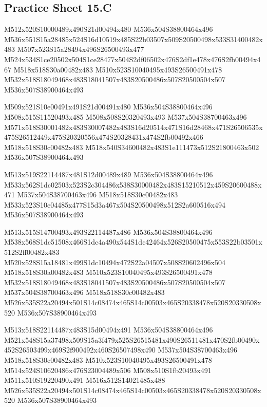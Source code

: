 \documentclass{article}
\begin{document}
\subsection{Practice Sheet 15.C}

\begin{multicols}{5}
\begin{center}

M512x520S10000489x490S21d00494x480 %
M536x504S38800464x496 %
M536x551S15a28485x524S16d10519x485S22b03507x509S20500498x533S31400482x483 %
M507x523S15a28494x496S26500493x477 %
M524x534S1ce20502x504S1ce28477x504S2df06502x476S2df1e478x476S2fb00494x467 %
M518x518S30a00482x483 %
M510x523S10040495x493S26500491x478 %
M532x518S18049468x483S18041507x483S20500486x507S20500504x507 %
M536x507S38900464x493 %
\vfil
\columnbreak

M509x521S10e00491x491S21d00491x480 %
M536x504S38800464x496 %
M508x515S11520493x485 %
M508x508S20320493x493 %
M537x504S38700463x496 %
M571x518S30001482x483S30007482x483S16d20514x471S16d28468x471S26506535x475S26512449x475S20320556x474S20328431x474S2fb00492x466 %
M518x518S30c00482x483 %
M518x540S34600482x483S1e111473x512S21800463x502 %
M536x507S38900464x493 %
\vfil
\columnbreak

M513x519S22114487x481S12d00489x489 %
M536x504S38800464x496 %
M533x562S1dc02503x523S2c304486x538S30000482x483S15210512x459S20600488x471 %
M537x504S38700463x496 %
M518x518S30c00482x483 %
M533x523S10e04485x477S15d3a467x504S20500498x512S2a600516x494 %
M536x507S38900464x493 %
\vfil
\columnbreak

M513x515S14700493x493S22114487x486 %
M536x504S38800464x496 %
M538x568S1dc51508x466S1dc4a490x544S1dc42464x526S20500475x553S22b03501x512S2ff00482x483 %
M520x528S15a18481x499S1dc10494x472S22a04507x508S20602496x504 %
M518x518S30a00482x483 %
M510x523S10040495x493S26500491x478 %
M532x518S18049468x483S18041507x483S20500486x507S20500504x507 %
M537x504S38700463x496 %
M518x518S30c00482x483 %
M526x535S22a20494x501S14c08474x465S14c00503x465S20338478x520S20330508x520 %
M536x507S38900464x493 %
\vfil
\columnbreak

M513x518S22114487x483S15d00494x491 %
M536x504S38800464x496 %
M521x548S15a37498x509S15a3f479x525S26515481x490S26511481x470S2fb00490x452S26503499x469S2f900492x460S26507498x490 %
M537x504S38700463x496 %
M518x518S30c00482x483 %
M510x523S10040495x493S26500491x478 %
M514x524S10620486x476S23004489x506 %
M508x510S1fb20493x491 %
M511x510S19220490x491 %
M516x512S14021485x488 %
M526x535S22a20494x501S14c08474x465S14c00503x465S20338478x520S20330508x520 %
M536x507S38900464x493 %
\vfil

\end{center}
\end{multicols}
\end{document}
